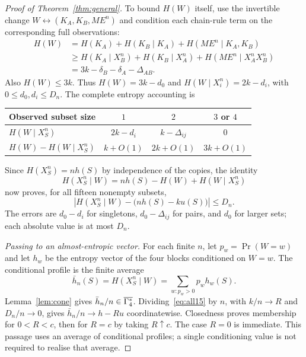\begin{proof}[Proof of Theorem~\ref{thm:general}]
To bound $H(W)$ itself, use the invertible change
$W\leftrightarrow(K_A,K_B,ME^n)$ and condition each chain-rule term
on the corresponding full observations:
\begin{align*}
 H(W)&=H(K_A)+H(K_B\mid K_A)+H(ME^n\mid K_A,K_B)\\
 &\ge H(K_A\mid X_B^n)+H(K_B\mid X_A^n)
                  +H(ME^n\mid X_A^nX_B^n)\\
 &=3k-\delta_B-\delta_A-\Delta_{AB}.
\end{align*}
Also $H(W)\le3k$. Thus $H(W)=3k-d_0$ and
$H(W\mid X_i^n)=2k-d_i$, with $0\le d_0,d_i\le D_n$.
The complete entropy accounting is
\begin{center}
\begin{tabular}{@{}lccc@{}}
\toprule
Observed subset size & $1$ & $2$ & $3$ or $4$\\
\midrule
$H(W\mid X_S^n)$ & $2k-d_i$ & $k-\Delta_{ij}$ & $0$\\
$H(W)-H(W\mid X_S^n)$ & $k+O(1)$ & $2k+O(1)$ & $3k+O(1)$\\
\bottomrule
\end{tabular}
\end{center}
Since $H(X_S^n)=nh(S)$ by independence of the copies, the identity
\[
 H(X_S^n\mid W)=nh(S)-H(W)+H(W\mid X_S^n)
\]
now proves, for all fifteen nonempty subsets,
\begin{equation}\label{eq:all15}
 \left|H(X_S^n\mid W)-\bigl(nh(S)-ku(S)\bigr)\right|\le D_n.
\end{equation}
The errors are $d_0-d_i$ for singletons, $d_0-\Delta_{ij}$ for pairs,
and $d_0$ for larger sets; each absolute value is at most $D_n$.

\smallskip\noindent\emph{Passing to an almost-entropic vector.}
For each finite $n$, let $p_w=\Pr(W=w)$ and let $h_w$ be the entropy
vector of the four blocks conditioned on $W=w$. The conditional profile
is the finite average
\[
 \bar h_n(S)=H(X_S^n\mid W)=\sum_{w:p_w>0}p_w h_w(S).
\]
Lemma~\ref{lem:cone} gives $\bar h_n/n\in\overline{\Gamma_4^{*}}$. Dividing~\eqref{eq:all15} by $n$, with $k/n\to R$ and $D_n/n\to0$,
gives $\bar h_n/n\to h-Ru$ coordinatewise. Closedness proves membership
for $0<R<c$, then for $R=c$ by taking $R\uparrow c$. The case $R=0$
is immediate. This passage uses an average of conditional profiles;
a single conditioning value is not required to realise that average.
\end{proof}

